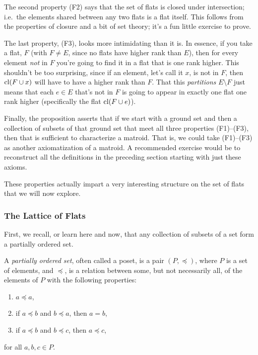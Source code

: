 \documentclass[12pt,oneside]{../../sfsuthesis}
\begin{document}
The second property (F2) says that the set of flats is closed under intersection;
i.e.\ the elements shared between any two flats is a flat itself.
This follows from the properties of closure and a bit of set theory; it's a fun little exercise to prove.

The last property, (F3), looks more intimidating than it is.
In essence, if you take a flat, \( F \) (with \( F \neq E \), since no flats have higher rank than \( E \)), then for every element \emph{not} in \( F \) you're going to find it in a flat that is one rank higher.
This shouldn't be too surprising, since if an element, let's call it \( x \), is not in \( F \), then \( \operatorname{cl}(F \cup x) \) will have to have a higher rank than \( F \).
That this \emph{partitions} \( E \setminus F \) just means that each \( e \in E \) that's not in \( F \) is going to appear in exactly one flat one rank higher (specifically the flat \( \operatorname{cl}(F \cup e) \)).

Finally, the proposition asserts that if we start with a ground set and then a collection of subsets of that ground set that meet all three properties (F1)--(F3), then that is sufficient to characterize a matroid.
That is, we could take (F1)--(F3) as another axiomatization of a matroid.
A recommended exercise would be to reconstruct all the definitions in the preceding section starting with just these axioms.

These properties actually impart a very interesting structure on the set of flats that we will now explore.

\subsubsection{The Lattice of Flats}

First, we recall, or learn here and now, that any collection of subsets of a set form a partially ordered set.

\begin{definition}\th\label{def:poset}
    A \emph{partially ordered set}, often called a poset, is a pair \( (P, \preceq) \), where \( P \) is a set of elements, and \( \preceq \), is a relation between some, but not necessarily all, of the elements of \( P \) with the following properties:
    \begin{enumerate}[label=\roman*.]
        \item\(a \preceq a\),
        \item if \( a \preceq b \) and \( b \preceq a \), then \( a = b \),
        \item if \( a \preceq b \) and \( b \preceq c \), then \( a \preceq c \),
    \end{enumerate}
    for all \( a, b, c \in P \).
\end{definition}
\end{document}
